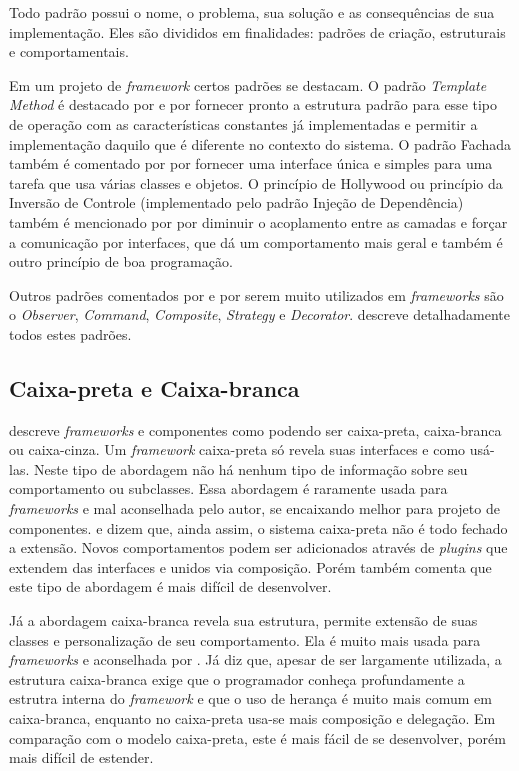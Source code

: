Todo padrão possui o nome, o problema, sua solução e as consequências de sua implementação. Eles são divididos em finalidades: padrões de criação, estruturais e comportamentais.

Em um projeto de \textit{framework} certos padrões se destacam. O padrão \textit{Template Method} é destacado por \cite{Larman2005} e \cite{Fayad1999} por fornecer pronto a estrutura padrão para esse tipo de operação com as características constantes já implementadas e permitir a implementação daquilo que é diferente no contexto do sistema. O padrão Fachada também é comentado por \cite{Larman2005} por fornecer uma interface única e simples para uma tarefa que usa várias classes e objetos. O princípio de Hollywood ou princípio da Inversão de Controle (implementado pelo padrão Injeção de Dependência) também é mencionado por \cite{Larman2005} por diminuir o acoplamento entre as camadas e forçar a comunicação por interfaces, que dá um comportamento mais geral e também é outro princípio de boa programação.

Outros padrões comentados por \cite{Larman2005} e \cite{Szyperski2002} por serem muito utilizados em \textit{frameworks} são o \textit{Observer}, \textit{Command}, \textit{Composite}, \textit{Strategy} e \textit{Decorator}. \cite{Gamma1995} descreve detalhadamente todos estes padrões.

\subsection{Caixa-preta e Caixa-branca}

\cite{Szyperski2002} descreve \textit{frameworks} e componentes como podendo ser caixa-preta, caixa-branca ou caixa-cinza. Um \textit{framework} caixa-preta só revela suas interfaces e como usá-las. Neste tipo de abordagem não há nenhum tipo de informação sobre seu comportamento ou subclasses. Essa abordagem é raramente usada para \textit{frameworks} e mal aconselhada pelo autor, se encaixando melhor para projeto de componentes. \cite{Szyperski2002} e \cite{Fayad1999} dizem que, ainda assim, o sistema caixa-preta não é todo fechado a extensão. Novos comportamentos podem ser adicionados através de \textit{plugins} que extendem das interfaces e unidos via composição. Porém \cite{Fayad1999} também comenta que este tipo de abordagem é mais difícil de desenvolver.

Já a abordagem caixa-branca revela sua estrutura, permite extensão de suas classes e personalização de seu comportamento. Ela é muito mais usada para \textit{frameworks} e aconselhada por \cite{Szyperski2002}. Já \cite{Fayad1999} diz que, apesar de ser largamente utilizada, a estrutura caixa-branca exige que o programador conheça profundamente a estrutra interna do \textit{framework} e que o uso de herança é muito mais comum em caixa-branca, enquanto no caixa-preta usa-se mais composição e delegação. Em comparação com o modelo caixa-preta, este é mais fácil de se desenvolver, porém mais difícil de estender.

